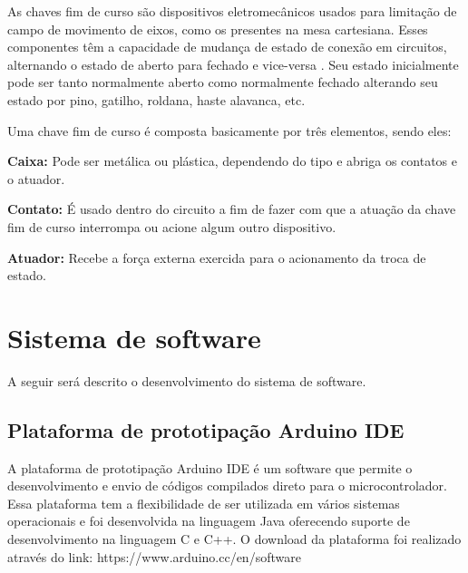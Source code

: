 As chaves fim de curso são dispositivos eletromecânicos usados para limitação de campo de movimento de eixos, 
como os presentes na mesa cartesiana. Esses componentes têm a capacidade de mudança de estado de conexão 
em circuitos, alternando o estado de aberto para fechado e vice-versa \cite{alciatore2014introduccao}. 
Seu estado inicialmente pode ser tanto normalmente aberto como normalmente fechado alterando seu estado 
por pino, gatilho, roldana, haste alavanca, etc. 

Uma chave fim de curso é composta basicamente por três elementos, sendo eles:

\begin{alineas}
    \item \textbf{Caixa:} Pode ser metálica ou plástica, dependendo do tipo e abriga os contatos e o atuador.
    \item \textbf{Contato:} É usado dentro do circuito a fim de fazer com que a atuação da chave fim de curso interrompa ou 
    acione algum outro dispositivo.
    \item \textbf{Atuador:} Recebe a força externa exercida para o acionamento da troca de estado.
\end{alineas}

\section{Sistema de software}\label{sec:metsissof}

A seguir será descrito o desenvolvimento do sistema de software.

\subsection{Plataforma de prototipação Arduino IDE}\label{subsec:metide}

A plataforma de prototipação Arduino \ac{IDE} é um software que permite o desenvolvimento e envio 
de códigos compilados direto para o microcontrolador. Essa plataforma tem a flexibilidade de 
ser utilizada em vários sistemas operacionais e foi desenvolvida na linguagem Java oferecendo 
suporte de desenvolvimento na linguagem C e C++. O download da plataforma foi realizado 
através do link: https://www.arduino.cc/en/software

